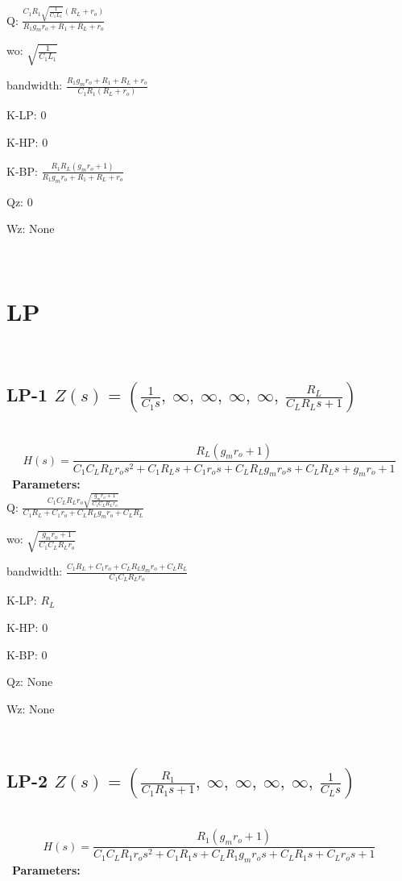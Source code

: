 \documentclass{article}
\begin{document}
Q: $\frac{C_{1} R_{1} \sqrt{\frac{1}{C_{1} L_{1}}} \left(R_{L} + r_{o}\right)}{R_{1} g_{m} r_{o} + R_{1} + R_{L} + r_{o}}$\ 

wo: $\sqrt{\frac{1}{C_{1} L_{1}}}$\ 

bandwidth: $\frac{R_{1} g_{m} r_{o} + R_{1} + R_{L} + r_{o}}{C_{1} R_{1} \left(R_{L} + r_{o}\right)}$\ 

K-LP: $0$\ 

K-HP: $0$\ 

K-BP: $\frac{R_{1} R_{L} \left(g_{m} r_{o} + 1\right)}{R_{1} g_{m} r_{o} + R_{1} + R_{L} + r_{o}}$\ 

Qz: $0$\ 

Wz: $\text{None}$\ 

\ 

\section{LP}\ 
\subsection{LP-1 $Z(s) = \left( \frac{1}{C_{1} s}, \  \infty, \  \infty, \  \infty, \  \infty, \  \frac{R_{L}}{C_{L} R_{L} s + 1}\right)$ } \ 
\textbf{\[H(s) = \frac{R_{L} \left(g_{m} r_{o} + 1\right)}{C_{1} C_{L} R_{L} r_{o} s^{2} + C_{1} R_{L} s + C_{1} r_{o} s + C_{L} R_{L} g_{m} r_{o} s + C_{L} R_{L} s + g_{m} r_{o} + 1}\] } \ 
\textbf{Parameters:}\\ 

Q: $\frac{C_{1} C_{L} R_{L} r_{o} \sqrt{\frac{g_{m} r_{o} + 1}{C_{1} C_{L} R_{L} r_{o}}}}{C_{1} R_{L} + C_{1} r_{o} + C_{L} R_{L} g_{m} r_{o} + C_{L} R_{L}}$\ 

wo: $\sqrt{\frac{g_{m} r_{o} + 1}{C_{1} C_{L} R_{L} r_{o}}}$\ 

bandwidth: $\frac{C_{1} R_{L} + C_{1} r_{o} + C_{L} R_{L} g_{m} r_{o} + C_{L} R_{L}}{C_{1} C_{L} R_{L} r_{o}}$\ 

K-LP: $R_{L}$\ 

K-HP: $0$\ 

K-BP: $0$\ 

Qz: $\text{None}$\ 

Wz: $\text{None}$\ 

\ 

\subsection{LP-2 $Z(s) = \left( \frac{R_{1}}{C_{1} R_{1} s + 1}, \  \infty, \  \infty, \  \infty, \  \infty, \  \frac{1}{C_{L} s}\right)$ } \ 
\textbf{\[H(s) = \frac{R_{1} \left(g_{m} r_{o} + 1\right)}{C_{1} C_{L} R_{1} r_{o} s^{2} + C_{1} R_{1} s + C_{L} R_{1} g_{m} r_{o} s + C_{L} R_{1} s + C_{L} r_{o} s + 1}\] } \ 
\textbf{Parameters:}\\ 
\end{document}

